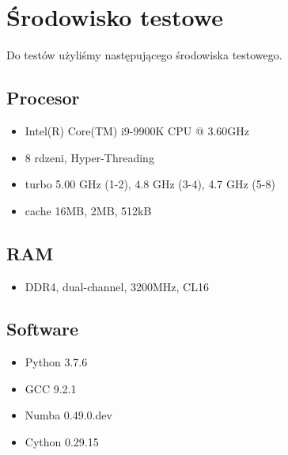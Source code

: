 \section{Środowisko testowe}

Do testów użyliśmy następującego środowiska testowego.

\subsection{Procesor}

\begin{itemize}
    \item Intel(R) Core(TM) i9-9900K CPU @ 3.60GHz
    \item 8 rdzeni, Hyper-Threading
    \item turbo 5.00 GHz (1-2), 4.8 GHz (3-4), 4.7 GHz (5-8)
    \item cache 16MB, 2MB, 512kB
\end{itemize}

\subsection{RAM}

\begin{itemize}
    \item DDR4, dual-channel, 3200MHz, CL16
\end{itemize}

\subsection{Software}

\begin{itemize}
    \item Python 3.7.6
    \item GCC 9.2.1
    \item Numba 0.49.0.dev
    \item Cython 0.29.15
\end{itemize}
